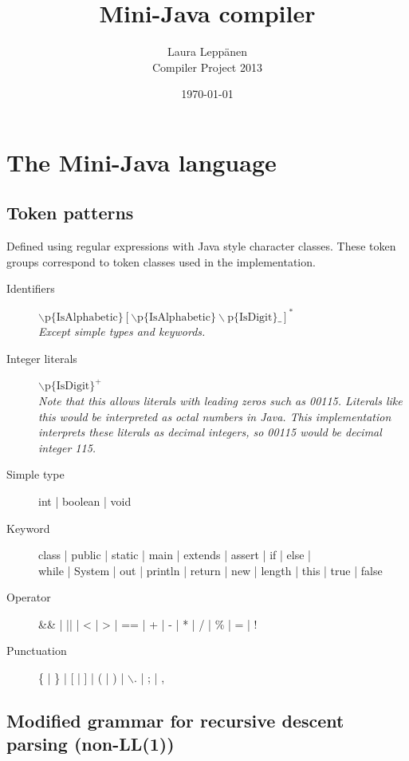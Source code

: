\documentclass[a4paper,11pt]{article}
\begin{document}
\title{Mini-Java compiler}
\author{Laura Leppänen \\ Compiler Project 2013}
\date{\today}
\maketitle
\thispagestyle{empty}

\tableofcontents
\onehalfspacing

\newpage
\setcounter{page}{1}

\section{The Mini-Java language}

\subsection{Token patterns}

Defined using regular expressions with Java style character classes. These token groups correspond to token classes used in the implementation.

\begin{description}
\item[Identifiers] $\backslash\text{p\{IsAlphabetic\}} [ \backslash\text{p\{IsAlphabetic\}}\backslash\text{p\{IsDigit\}\_ } ]^{*}$ \\ \emph{Except simple types and keywords.}
\item[Integer literals] $\backslash\text{p\{IsDigit\}}^{+}$ \\ \emph{Note that this allows literals with leading zeros such as 00115. Literals like this would be interpreted as octal numbers in Java. This implementation interprets these literals as decimal integers, so 00115 would be decimal integer 115.}
\item[Simple type] int | boolean | void
\item[Keyword] class | public | static | main | extends | assert | if | else | \\ while | System | out | println | return | new | length | this | true | false
\item[Operator] \&\& | || | < | > | == | + | - | *  | / | \% | = | !
\item[Punctuation] \{ | \} | [ | ] | ( | ) | $\backslash$. | ; | ,
\end{description}

\subsection{Modified grammar for recursive descent parsing (non-LL(1))}
\end{document}
